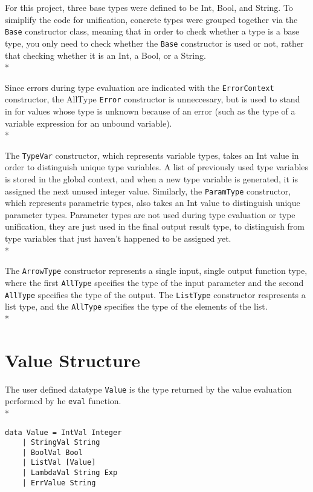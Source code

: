 \documentclass[11pt]{article}
\begin{document}
For this project, three base types were defined to be Int, Bool, and String.  To simiplify the code for unification, concrete types were grouped together via the \verb|Base| constructor class, meaning that in order to check whether a type is a base type, you only need to check whether the \verb|Base| constructor is used or not, rather that checking whether it is an Int, a Bool, or a String.\\*

Since errors during type evaluation are indicated with the \verb|ErrorContext| constructor, the AllType \verb|Error| constructor is unneccesary, but is used to stand in for values whose type is unknown because of an error (such as the type of a variable expression for an unbound variable).\\*

The \verb|TypeVar| constructor, which represents variable types, takes an Int value in order to distinguish unique type variables.  A list of previously used type variables is stored in the global context, and when a new type variable is generated, it is assigned the next unused integer value.  Similarly, the \verb|ParamType| constructor, which represents parametric types, also takes an Int value to distinguish unique parameter types.  Parameter types are not used during type evaluation or type unification, they are just used in the final output result type, to distinguish from type variables that just haven't happened to be assigned yet. \\*

The \verb|ArrowType| constructor represents a single input, single output function type, where the first \verb|AllType| specifies the type of the input parameter and the second \verb|AllType| specifies the type of the output.  The \verb|ListType| constructor respresents a list type, and the \verb|AllType| specifies the type of the elements of the list.\\*   

\section*{Value Structure}

The user defined datatype \verb|Value| is the type returned by the value evaluation performed by he \verb|eval| function.\\*

\begin{verbatim} 
data Value = IntVal Integer
    | StringVal String
    | BoolVal Bool
    | ListVal [Value]
    | LambdaVal String Exp
    | ErrValue String
\end{verbatim} 
\end{document}
